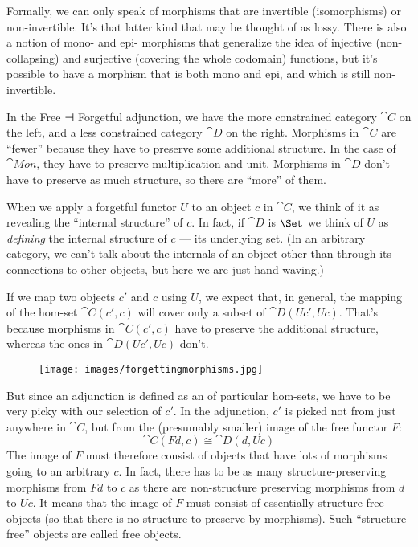 Formally, we can only speak of morphisms that are invertible
(isomorphisms) or non-invertible. It's that latter kind that may be
thought of as lossy. There is also a notion of mono- and epi- morphisms
that generalize the idea of injective (non-collapsing) and surjective
(covering the whole codomain) functions, but it's possible to have a
morphism that is both mono and epi, and which is still non-invertible.

In the Free ⊣ Forgetful adjunction, we have the more constrained
category $\cat{C}$ on the left, and a less constrained category $\cat{D}$
on the right. Morphisms in $\cat{C}$ are ``fewer'' because they have to
preserve some additional structure. In the case of $\cat{Mon}$, they
have to preserve multiplication and unit. Morphisms in $\cat{D}$ don't
have to preserve as much structure, so there are ``more'' of them.

When we apply a forgetful functor $U$ to an object $c$ in
$\cat{C}$, we think of it as revealing the ``internal structure'' of
$c$. In fact, if $\cat{D}$ is $\Set$ we think of $U$
as \emph{defining} the internal structure of $c$ --- its
underlying set. (In an arbitrary category, we can't talk about the
internals of an object other than through its connections to other
objects, but here we are just hand-waving.)

If we map two objects $c'$ and $c$ using $U$,
we expect that, in general, the mapping of the hom-set
$\cat{C}(c', c)$ will cover only a subset of
$\cat{D}(U c', U c)$. That's because morphisms in
$\cat{C}(c', c)$ have to preserve the additional structure,
whereas the ones in $\cat{D}(U c', U c)$ don't.

\begin{figure}[H]
\centering
\texttt{[image: images/forgettingmorphisms.jpg]}
\end{figure}

\noindent
But since an adjunction is defined as an  of
particular hom-sets, we have to be very picky with our selection of
$c'$. In the adjunction, $c'$ is picked not
from just anywhere in $\cat{C}$, but from the (presumably smaller) image
of the free functor $F$:
\[\cat{C}(F d, c) \cong \cat{D}(d, U c)\]
The image of $F$ must therefore consist of objects that have lots
of morphisms going to an arbitrary $c$. In fact, there has to be
as many structure-preserving morphisms from $F d$ to $c$
as there are non-structure preserving morphisms from $d$ to
$U c$. It means that the image of $F$ must consist of
essentially structure-free objects (so that there is no structure to
preserve by morphisms). Such ``structure-free'' objects are called free
objects.

